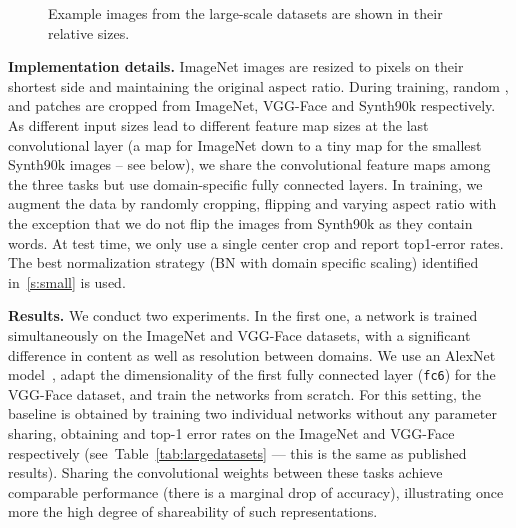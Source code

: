 \documentclass[10pt,twocolumn,letterpaper]{article}
\renewcommand{\paragraph}[1]{\par\medskip\noindent\textbf{#1}}
\begin{document}
\begin{figure}
\centering
{}
  \caption{Example images from the large-scale datasets are shown in their relative sizes.}
 \label{tab:samples-large}
\end{figure}
  
 
\paragraph{Implementation details.} ImageNet images are resized to  pixels on their shortest side and maintaining the original aspect ratio. During training, random ,  and  patches are cropped from ImageNet, VGG-Face and Synth90k  respectively. As different input sizes lead to different feature map sizes at the last convolutional layer (a  map for ImageNet down to a tiny  map for the smallest Synth90k images -- see below), we share the convolutional feature maps among the three tasks but use domain-specific fully connected layers. In training, we augment the data by randomly cropping, flipping and varying aspect ratio with the exception that we do not flip the images from Synth90k as they contain words. At test time, we only use a single center crop and report top1-error rates. The best normalization strategy (BN with domain specific scaling) identified in~\ref{s:small} is used.

\paragraph{Results.} We conduct two experiments. In the first one, a network is trained simultaneously on the ImageNet and VGG-Face datasets, with a significant difference in content as well as resolution between domains. We use an AlexNet model~\cite{krizhevsky12imagenet}, adapt the dimensionality of the first fully connected layer (\texttt{fc6}) for the VGG-Face dataset, and train the networks from scratch. For this setting, the baseline is obtained by training two individual networks without any parameter sharing, obtaining  and  top-1 error rates on the ImageNet and VGG-Face respectively (see~Table~\ref{tab:largedatasets} --- this is the same as published results). Sharing the convolutional weights between these tasks achieve comparable performance (there is a marginal drop of  accuracy), illustrating once more the high degree of shareability of such representations.
\end{document}

